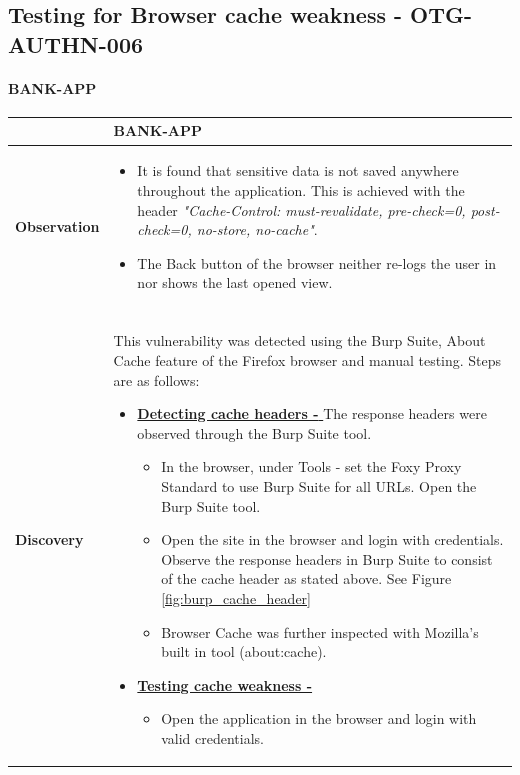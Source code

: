 \subsection{Testing for Browser cache weakness - OTG-AUTHN-006}

\paragraph{BANK-APP} \mbox{}
\begin{longtable*}{p{.20\textwidth} | p{.80\textwidth}}
    \hline
    & \textbf{BANK-APP} \\
    \hline
    \textbf{Observation} &
     \begin{itemize}
     \item It is found that sensitive data is not saved anywhere throughout the application. This is achieved with the header
          \textit{"Cache-Control: must-revalidate, pre-check=0, post-check=0, no-store, no-cache"}.
     
     \item The Back button of the browser neither re-logs the user in nor shows the last opened view.
     \end{itemize}
    \\\\
    \textbf{Discovery} &
      This vulnerability was detected using the Burp Suite, About Cache feature of the Firefox browser and manual testing. Steps are as follows:
      \begin{itemize}
	      \item \underline{\textbf{Detecting cache headers - }} The response headers were observed through the Burp Suite tool.
	      
	      \begin{itemize}
		      \item In the browser, under Tools - set the Foxy Proxy Standard to use Burp Suite for all URLs. Open the Burp Suite tool.		      
		      \item  Open the site in the browser and login with credentials. Observe the response headers in Burp Suite to consist of the cache header as stated above. See Figure \ref{fig:burp_cache_header}
		      \item  Browser Cache was further inspected with Mozilla's built in tool (about:cache).
	      \end{itemize}
	   \item \underline{\textbf{Testing cache weakness -}}
	   	\begin{itemize}
		   	\item Open the application in the browser and login with valid credentials.
		   	

\end{itemize}
\end{itemize}
\end{longtable*}
